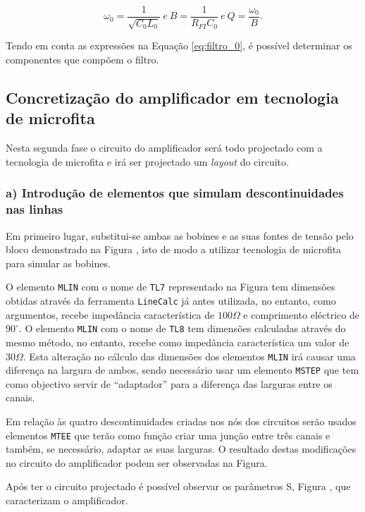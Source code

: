 \documentclass[11pt]{article}
\numberwithin{equation}{section}
\begin{document}
\begin{equation}
\omega_{0}=\frac{1}{\sqrt{C_{0}L_{0}}} ~ e ~ B=\frac{1}{R_{FI}C_{0}} ~ e ~ Q=\frac{\omega_{0}}{B}.
\label{eq:filtro_0}
\end{equation}

Tendo em conta as expressões na Equação \ref{eq:filtro_0}, é possível determinar os componentes que compõem o filtro.

\subsection{Concretização do amplificador em tecnologia de microfita}

Nesta segunda fase o circuito do amplificador será todo projectado com a tecnologia de microfita e irá ser projectado um \textit{layout} do circuito.

\subsubsection{a) Introdução de elementos que simulam descontinuidades nas linhas}

Em primeiro lugar, substitui-se ambas as bobines e as suas fontes de tensão pelo bloco demonstrado na Figura , isto de modo a utilizar tecnologia de microfita para simular as bobines. 


O elemento \texttt{MLIN} com o nome de \texttt{TL7} representado na Figura  tem dimensões obtidas através da ferramenta \texttt{LineCalc} já antes utilizada, no entanto, como argumentos, recebe impedância característica de $100 \Omega$ e comprimento eléctrico de $90^{\circ}$. O elemento \texttt{MLIN} com o nome de \texttt{TL8} tem dimensões calculadas através do mesmo método, no entanto, recebe como impedância característica um valor de $30 \Omega$. Esta alteração no cálculo das dimensões dos elementos \texttt{MLIN} irá causar uma diferença na largura de ambos, sendo necessário usar um elemento \texttt{MSTEP} que tem como objectivo servir de ``adaptador'' para a diferença das larguras entre os canais.

Em relação às quatro descontinuidades criadas nos nós dos circuitos serão usados elementos \texttt{MTEE} que terão como função criar uma junção entre três canais e também, se necessário, adaptar as suas larguras. O resultado destas modificações no circuito do amplificador podem ser observadas na Figura.

Após ter o circuito projectado é possível observar os parâmetros S, Figura , que caracterizam o amplificador.
\end{document}
